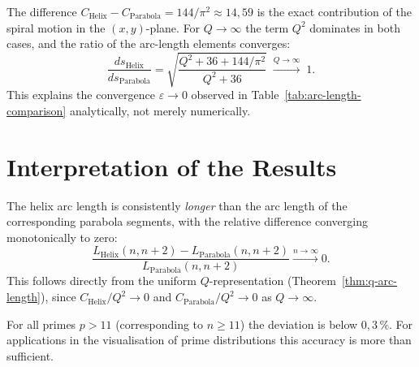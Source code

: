 \begin{remark}\label{rem:geometric-meaning-Q}
The difference $C_{\mathrm{Helix}} - C_{\mathrm{Parabola}} = 144/\pi^2
\approx 14{,}59$ is the exact contribution of the spiral motion in the
$(x,y)$-plane. For $Q \to \infty$ the term $Q^2$ dominates in both
cases, and the ratio of the arc-length elements converges:
\[
  \frac{ds_{\mathrm{Helix}}}{ds_{\mathrm{Parabola}}}
  = \sqrt{\frac{Q^2 + 36 + 144/\pi^2}{Q^2 + 36}}
  \;\xrightarrow{Q\to\infty}\; 1.
\]
This explains the convergence $\varepsilon \to 0$ observed in
Table~\ref{tab:arc-length-comparison} analytically, not merely
numerically.
\end{remark}

\section{Interpretation of the Results}

\begin{proposition}
\label{prop:arc-length-convergence}
The helix arc length is consistently \emph{longer} than the arc length
of the corresponding parabola segments, with the relative difference
converging monotonically to zero:
\[
\frac{L_{\mathrm{Helix}}(n, n+2) - L_{\mathrm{Parabola}}(n, n+2)}
{L_{\mathrm{Parabola}}(n, n+2)}
\xrightarrow{n \to \infty} 0.
\]
This follows directly from the uniform $Q$-representation
(Theorem~\ref{thm:q-arc-length}), since
$C_{\mathrm{Helix}}/Q^2 \to 0$ and
$C_{\mathrm{Parabola}}/Q^2 \to 0$ as $Q \to \infty$.
\end{proposition}

\begin{corollary}\label{cor:practical-accuracy}
For all primes $p > 11$ (corresponding to $n \ge 11$) the deviation is
below $0{,}3\,\%$. For applications in the visualisation of prime
distributions this accuracy is more than sufficient.
\end{corollary}
